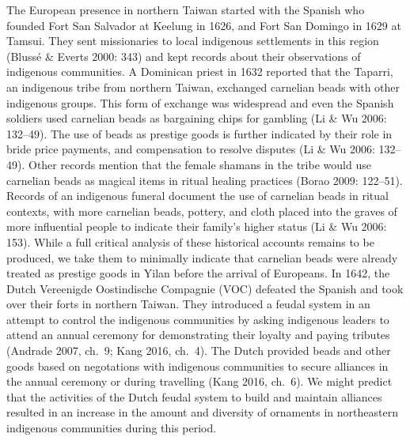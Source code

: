 \documentclass[]{article}
\begin{document}
The European presence in northern Taiwan started with the Spanish who
founded Fort San Salvador at Keelung in 1626, and Fort San Domingo in
1629 at Tamsui. They sent missionaries to local indigenous settlements
in this region (Blussé \& Everts 2000: 343) and kept records about their
observations of indigenous communities. A Dominican priest in 1632
reported that the Taparri, an indigenous tribe from northern Taiwan,
exchanged carnelian beads with other indigenous groups. This form of
exchange was widespread and even the Spanish soldiers used carnelian
beads as bargaining chips for gambling (Li \& Wu 2006: 132--49). The use
of beads as prestige goods is further indicated by their role in bride
price payments, and compensation to resolve disputes (Li \& Wu 2006:
132--49). Other records mention that the female shamans in the tribe
would use carnelian beads as magical items in ritual healing practices
(Borao 2009: 122--51). Records of an indigenous funeral document the use
of carnelian beads in ritual contexts, with more carnelian beads,
pottery, and cloth placed into the graves of more influential people to
indicate their family's higher status (Li \& Wu 2006: 153). While a full
critical analysis of these historical accounts remains to be produced,
we take them to minimally indicate that carnelian beads were already
treated as prestige goods in Yilan before the arrival of Europeans. In
1642, the Dutch Vereenigde Oostindische Compagnie (VOC) defeated the
Spanish and took over their forts in northern Taiwan. They introduced a
feudal system in an attempt to control the indigenous communities by
asking indigenous leaders to attend an annual ceremony for demonstrating
their loyalty and paying tributes (Andrade 2007, ch.~9; Kang 2016,
ch.~4). The Dutch provided beads and other goods based on negotations
with indigenous communities to secure alliances in the annual ceremony
or during travelling (Kang 2016, ch.~6). We might predict that the
activities of the Dutch feudal system to build and maintain alliances
resulted in an increase in the amount and diversity of ornaments in
northeastern indigenous communities during this period.
\end{document}

